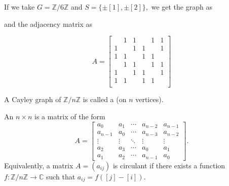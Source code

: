 \begin{ex}
    If we take $G = \mathbb{Z}/6\mathbb{Z}$ and $S = \{\pm [1], \pm [2]\},$ we get the graph as
    \begin{center}
        \captionsetup{type=figure}
         \label{fig:cayleyz6z}
    \end{center}

    and the adjacency matrix as

    \begin{equation*} 
        A = \begin{bmatrix}
              & 1 & 1 &   & 1 & 1 \\
            1 &   & 1 & 1 &   & 1 \\
            1 & 1 &   & 1 & 1 &   \\
              & 1 & 1 &   & 1 & 1 \\
            1 &   & 1 & 1 &   & 1 \\
            1 & 1 &   & 1 & 1 &   \\
        \end{bmatrix}
    \end{equation*}
\end{ex}

\begin{defn}%
    A Cayley graph of $\mathbb{Z}/n\mathbb{Z}$ is called a  (on $n$ vertices).
\end{defn}

\begin{defn}%
    An $n \times n$  is a matrix of the form
    \begin{equation*} 
        A = \begin{bmatrix}
            a_0 & a_1 & \cdots & a_{n - 2} & a_{n - 1} \\
            a_{n - 1} & a_0 & \cdots & a_{n - 3} & a_{n - 2}\\
            \vdots & \vdots & \ddots & \vdots & \vdots \\
            a_2 & a_3 & \cdots & a_{0} & a_1\\
            a_1 & a_2 & \cdots & a_{n - 1} & a_0
        \end{bmatrix}.
    \end{equation*}
    Equivalently, a matrix $A = (a_{ij})$ is circulant if there exists a function $f : \mathbb{Z}/n\mathbb{Z} \to \mathbb{C}$ such that $a_{ij} = f([j] - [i]).$
\end{defn} 

